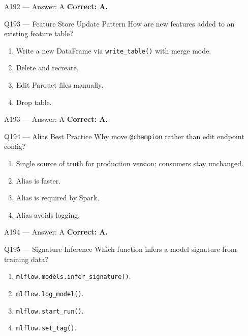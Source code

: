 \documentclass[aspectratio=169,9pt]{beamer}
\begin{document}
	\begin{frame}{A192 --- Answer: A}
		\textbf{Correct: A.}
	\end{frame}
	
	\begin{frame}{Q193 --- Feature Store Update Pattern}
		How are new features added to an existing feature table?
		\begin{enumerate}[label=\Alph*.]
			\item Write a new DataFrame via \texttt{write\_table()} with merge mode.
			\item Delete and recreate.
			\item Edit Parquet files manually.
			\item Drop table.
		\end{enumerate}
	\end{frame}
	
	\begin{frame}{A193 --- Answer: A}
		\textbf{Correct: A.}
	\end{frame}
	
	\begin{frame}{Q194 --- Alias Best Practice}
		Why move \texttt{@champion} rather than edit endpoint config?
		\begin{enumerate}[label=\Alph*.]
			\item Single source of truth for production version; consumers stay unchanged.
			\item Alias is faster.
			\item Alias is required by Spark.
			\item Alias avoids logging.
		\end{enumerate}
	\end{frame}
	
	\begin{frame}{A194 --- Answer: A}
		\textbf{Correct: A.}
	\end{frame}
	
	\begin{frame}{Q195 --- Signature Inference}
		Which function infers a model signature from training data?
		\begin{enumerate}[label=\Alph*.]
			\item \texttt{mlflow.models.infer\_signature()}.
			\item \texttt{mlflow.log\_model()}.
			\item \texttt{mlflow.start\_run()}.
			\item \texttt{mlflow.set\_tag()}.
		\end{enumerate}
	\end{frame}
	
\end{document}
